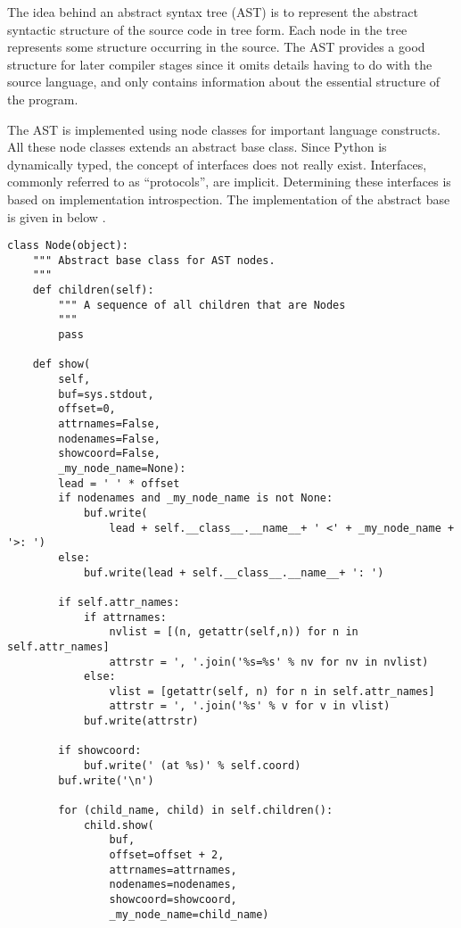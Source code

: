 The idea behind an abstract syntax tree (AST) is to represent the
abstract syntactic structure of the source code in tree form. Each
node in the tree represents some structure occurring in the source. The
AST provides a good structure for later compiler stages since it omits
details having to do with the source language, and only contains
information about the essential structure of the program.

The AST is implemented using node classes for important language
constructs. All these node classes extends an abstract base
class. Since Python is dynamically typed, the concept of interfaces
does not really exist. Interfaces, commonly referred to as
``protocols'', are implicit. Determining these interfaces is based on
implementation introspection. The implementation of the abstract base
is given in 
below \citep{pycparser:online}.

\begin{lstlisting}
class Node(object):
    """ Abstract base class for AST nodes.
    """
    def children(self):
        """ A sequence of all children that are Nodes
        """
        pass

    def show(
        self,
        buf=sys.stdout,
        offset=0,
        attrnames=False,
        nodenames=False,
        showcoord=False,
        _my_node_name=None):
        lead = ' ' * offset
        if nodenames and _my_node_name is not None:
            buf.write(
                lead + self.__class__.__name__+ ' <' + _my_node_name + '>: ')
        else:
            buf.write(lead + self.__class__.__name__+ ': ')

        if self.attr_names:
            if attrnames:
                nvlist = [(n, getattr(self,n)) for n in self.attr_names]
                attrstr = ', '.join('%s=%s' % nv for nv in nvlist)
            else:
                vlist = [getattr(self, n) for n in self.attr_names]
                attrstr = ', '.join('%s' % v for v in vlist)
            buf.write(attrstr)

        if showcoord:
            buf.write(' (at %s)' % self.coord)
        buf.write('\n')

        for (child_name, child) in self.children():
            child.show(
                buf,
                offset=offset + 2,
                attrnames=attrnames,
                nodenames=nodenames,
                showcoord=showcoord,
                _my_node_name=child_name)
\end{lstlisting}

